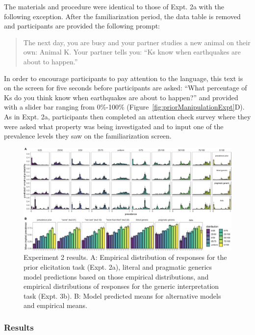 \documentclass[floatsintext,doc]{apa6}
\begin{document}
The materials and procedure were identical to those of Expt. 2a with the following exception.
After the familiarization period, the data table is removed and participants are provided the following prompt:

\begin{quote}
The next day, you are busy and your partner studies a new animal on their own: Animal K.
Your partner tells you: \enquote{Ks know when earthquakes are about to happen.}
\end{quote}

In order to encourage participants to pay attention to the language, this text is on the screen for five seconds before participants are asked: \enquote{What percentage of Ks do you think know when earthquakes are about to happen?} and provided with a slider bar ranging from 0\%-100\% (Figure~\ref{fig:priorManipulationExpt}D).
As in Expt. 2a, participants then completed an attention check survey where they were asked what property was being investigated and to input one of the prevalence levels they saw on the familiarization screen.

\begin{figure}
\centering
\includegraphics{genint_files/figure-latex/priorManipulationResults-1.pdf}
\caption{\label{fig:priorManipulationResults}Experiment 2 results. A: Empirical distribution of responses for the prior elicitation task (Expt. 2a), literal and pragmatic generics model predictions based on those empirical distributions, and empirical distributions of responses for the generic interpretation task (Expt. 3b). B: Model predicted means for alternative models and empirical means.}
\end{figure}

\hypertarget{results-2}{%
\subsubsection{Results}\label{results-2}}
\end{document}

